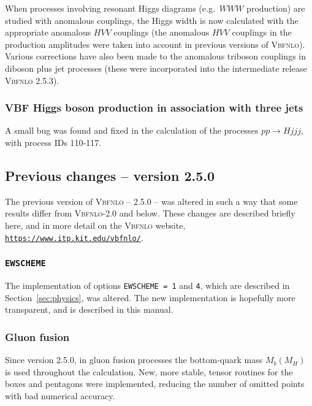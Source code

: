 \documentclass[english,12pt]{article}
\begin{document}
When processes involving resonant Higgs diagrams (e.g.\ $WWW$ production) are studied with anomalous couplings, the Higgs width is now calculated with the appropriate anomalous $HVV$ couplings (the anomalous $HVV$ couplings in the production amplitudes were taken into account in previous versions of \textsc{Vbfnlo}).  Various corrections have also been made to the anomalous triboson couplings in diboson plus jet processes (these were incorporated into the intermediate release \textsc{Vbfnlo} 2.5.3).

\subsubsection{VBF Higgs boson production in association with three jets}
A small bug was found and fixed in the calculation of the processes $pp \rightarrow H jjj$, with process IDs 110-117.


\subsection{Previous changes -- version 2.5.0}

The previous version of \textsc{Vbfnlo -- 2.5.0} -- was altered in such a
way that some results differ from \textsc{Vbfnlo-2.0} and below.  These changes are
described briefly here, and in more detail on the \textsc{Vbfnlo} website, {\tt
\url{https://www.itp.kit.edu/vbfnlo/}}.


\subsubsection{{\tt EWSCHEME}}

The implementation of options {\tt EWSCHEME = 1} and {\tt 4}, which are
described in Section~\ref{sec:physics}, was altered.  The new
implementation is hopefully more transparent, and is described in this manual. 

\subsubsection{Gluon fusion}

Since version 2.5.0, in gluon fusion processes the bottom-quark
mass $M_{b}(M_{H})$ is used throughout the calculation.  New, more stable,
tensor routines for the boxes and pentagons were implemented, reducing the
number of omitted points with bad numerical accuracy.


\end{document}
